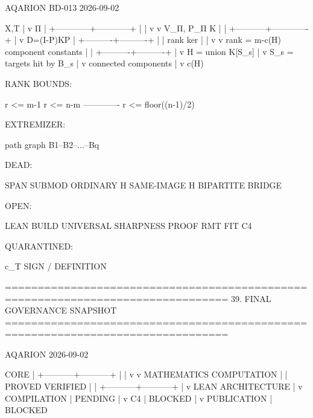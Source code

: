                     AQARION BD-013
                     2026-09-02

                         X,T
                          |
                          v
                         Π
                          |
             +------------+------------+
             |                         |
             v                         v
          V_Π, P_Π                    K
             |                         |
             +-----------+-------------+
                         |
                         v
             D=(I-P)KP
                         |
              +----------+----------+
              |                     |
             rank                  ker
              |                     |
              v                     v
      rank = m-c(H)          component constants
              |                     |
              +----------+----------+
                         |
                         v
                 H = union K[S_s]
                         |
                         v
            S_s = targets hit by B_s
                         |
                         v
                  connected components
                         |
                         v
                    c(H)

RANK BOUNDS:

r <= m-1
r <= n-m
-------------
r <= floor((n-1)/2)

EXTREMIZER:

path graph
B1--B2--...--Bq

DEAD:

SPAN
SUBMOD
ORDINARY H
SAME-IMAGE H
BIPARTITE BRIDGE

OPEN:

LEAN BUILD
UNIVERSAL SHARPNESS PROOF
RMT FIT
C4

QUARANTINED:

c_T SIGN / DEFINITION

================================================================================
39. FINAL GOVERNANCE SNAPSHOT
================================================================================

                    AQARION 2026-09-02

                         CORE
                          |
              +-----------+-----------+
              |                       |
              v                       v
        MATHEMATICS                 COMPUTATION
              |                       |
             PROVED                  VERIFIED
              |                       |
              +-----------+-----------+
                          |
                          v
                   LEAN ARCHITECTURE
                          |
                          v
                     COMPILATION
                          |
                       PENDING
                          |
                          v
                         C4
                          |
                       BLOCKED
                          |
                          v
                    PUBLICATION
                          |
                       BLOCKED

